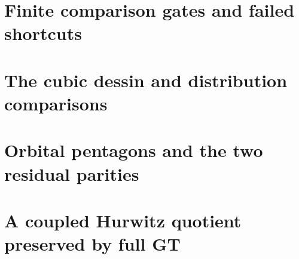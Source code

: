 \documentclass[11pt]{article}
\begin{document}
\section{Finite comparison gates and failed shortcuts}























\section{The cubic dessin and distribution comparisons}








\section{Orbital pentagons and the two residual parities}







\section{A coupled Hurwitz quotient preserved by full GT}





\end{document}
